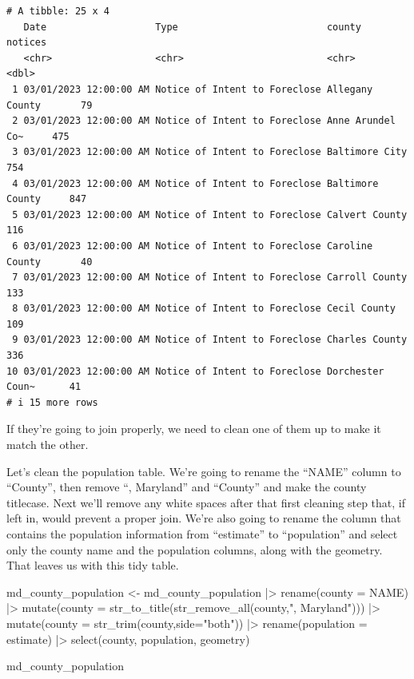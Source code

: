 \documentclass[
  letterpaper,
  DIV=11,
  numbers=noendperiod]{scrreprt}
\newenvironment{Shaded}{\begin{snugshade}}{\end{snugshade}}
\newcommand{\AttributeTok}[1]{\textcolor[rgb]{0.40,0.45,0.13}{#1}}
\newcommand{\FunctionTok}[1]{\textcolor[rgb]{0.28,0.35,0.67}{#1}}
\newcommand{\NormalTok}[1]{\textcolor[rgb]{0.00,0.23,0.31}{#1}}
\newcommand{\OtherTok}[1]{\textcolor[rgb]{0.00,0.23,0.31}{#1}}
\newcommand{\SpecialCharTok}[1]{\textcolor[rgb]{0.37,0.37,0.37}{#1}}
\newcommand{\StringTok}[1]{\textcolor[rgb]{0.13,0.47,0.30}{#1}}
\begin{document}
\begin{verbatim}
# A tibble: 25 x 4
   Date                   Type                          county           notices
   <chr>                  <chr>                         <chr>              <dbl>
 1 03/01/2023 12:00:00 AM Notice of Intent to Foreclose Allegany County       79
 2 03/01/2023 12:00:00 AM Notice of Intent to Foreclose Anne Arundel Co~     475
 3 03/01/2023 12:00:00 AM Notice of Intent to Foreclose Baltimore City       754
 4 03/01/2023 12:00:00 AM Notice of Intent to Foreclose Baltimore County     847
 5 03/01/2023 12:00:00 AM Notice of Intent to Foreclose Calvert County       116
 6 03/01/2023 12:00:00 AM Notice of Intent to Foreclose Caroline County       40
 7 03/01/2023 12:00:00 AM Notice of Intent to Foreclose Carroll County       133
 8 03/01/2023 12:00:00 AM Notice of Intent to Foreclose Cecil County         109
 9 03/01/2023 12:00:00 AM Notice of Intent to Foreclose Charles County       336
10 03/01/2023 12:00:00 AM Notice of Intent to Foreclose Dorchester Coun~      41
# i 15 more rows
\end{verbatim}

If they're going to join properly, we need to clean one of them up to
make it match the other.

Let's clean the population table. We're going to rename the ``NAME''
column to ``County'', then remove ``, Maryland'' and ``County'' and make
the county titlecase. Next we'll remove any white spaces after that
first cleaning step that, if left in, would prevent a proper join. We're
also going to rename the column that contains the population information
from ``estimate'' to ``population'' and select only the county name and
the population columns, along with the geometry. That leaves us with
this tidy table.

\begin{Shaded}
\begin{Highlighting}[]
\NormalTok{md\_county\_population }\OtherTok{\textless{}{-}}\NormalTok{ md\_county\_population }\SpecialCharTok{|\textgreater{}}
  \FunctionTok{rename}\NormalTok{(}\AttributeTok{county =}\NormalTok{ NAME) }\SpecialCharTok{|\textgreater{}}
  \FunctionTok{mutate}\NormalTok{(}\AttributeTok{county =} \FunctionTok{str\_to\_title}\NormalTok{(}\FunctionTok{str\_remove\_all}\NormalTok{(county,}\StringTok{", Maryland"}\NormalTok{))) }\SpecialCharTok{|\textgreater{}}
  \FunctionTok{mutate}\NormalTok{(}\AttributeTok{county =} \FunctionTok{str\_trim}\NormalTok{(county,}\AttributeTok{side=}\StringTok{"both"}\NormalTok{)) }\SpecialCharTok{|\textgreater{}}
  \FunctionTok{rename}\NormalTok{(}\AttributeTok{population =}\NormalTok{ estimate) }\SpecialCharTok{|\textgreater{}}
  \FunctionTok{select}\NormalTok{(county, population, geometry)}

\NormalTok{md\_county\_population}
\end{Highlighting}
\end{Shaded}
\end{document}
